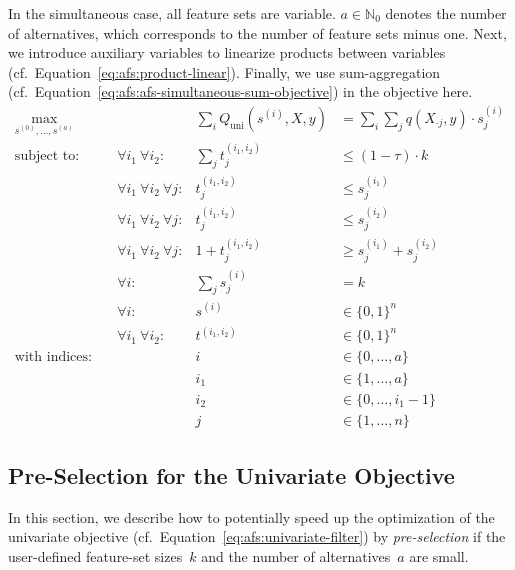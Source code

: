 \documentclass{article}
\theoremstyle{definition}
\begin{document}
In the simultaneous case, all feature sets are variable.
$a \in \mathbb{N}_0$ denotes the number of alternatives, which corresponds to the number of feature sets minus one.
Next, we introduce auxiliary variables to linearize products between variables (cf.~Equation~\ref{eq:afs:product-linear}).
Finally, we use sum-aggregation (cf.~Equation~\ref{eq:afs:afs-simultaneous-sum-objective}) in the objective here.
%
\begin{equation}
	\begin{aligned}
		\max_{s^{(0)}, \dots, s^{(a)}} &\quad & \sum_i Q_{\text{uni}}(s^{(i)},X,y) &= \sum_i \sum_j q(X_{\cdot{}j},y) \cdot s^{(i)}_j\\
		\text{subject to:} &\quad \forall i_1~\forall i_2: & \sum_j t^{(i_1,i_2)}_j &\leq (1 - \tau) \cdot k \\
		&\quad \forall i_1~\forall i_2~\forall j: & t^{(i_1,i_2)}_j &\leq s^{(i_1)}_j \\
		&\quad \forall i_1~\forall i_2~\forall j: & t^{(i_1,i_2)}_j &\leq s^{(i_2)}_j \\
		&\quad \forall i_1~\forall i_2~\forall j: & 1 + t^{(i_1,i_2)}_j &\geq s^{(i_1)}_j + s^{(i_2)}_j \\
		&\quad \forall i: & \sum_j s^{(i)}_j &= k \\
		&\quad \forall i: & s^{(i)} &\in \{0,1\}^n \\
		&\quad \forall i_1~\forall i_2: & t^{(i_1,i_2)} &\in \{0,1\}^n \\
		\text{with indices:} &\quad & i &\in \{0, \dots, a\} \\
		&\quad & i_1 &\in \{1, \dots, a\} \\
		&\quad & i_2 &\in \{0, \dots, i_1-1\} \\
		&\quad & j &\in \{1, \dots, n\}
	\end{aligned}
	\label{eq:afs:afs-simultaneous-complete}
\end{equation}

\subsection{Pre-Selection for the Univariate Objective}
\label{sec:afs:appendix:univariate-pre-selection}

In this section, we describe how to potentially speed up the optimization of the univariate objective (cf.~Equation~\ref{eq:afs:univariate-filter}) by \emph{pre-selection} if the user-defined feature-set sizes~$k$ and the number of alternatives~$a$ are small.
\end{document}
